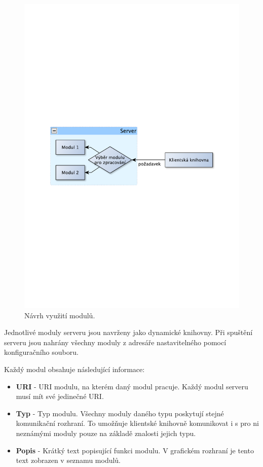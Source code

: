 \begin{figure}[h]
\centering
\includegraphics[trim=11cm 11cm 11cm 11cm, scale=0.7]{fig/navrh_moduly}
\caption{Návrh využití modulů.}
\label{fig:navrh_moduly}
\end{figure}

Jednotlivé moduly serveru jsou navrženy jako dynamické knihovny.
Při spuštění serveru jsou nahrány všechny moduly z adresáře nastavitelného pomocí konfiguračního souboru.

Každý modul obsahuje následující informace:

\begin{itemize}
\item \textbf{URI} - URI modulu, na kterém daný modul pracuje. Každý modul serveru musí mít své jedinečné URI.
\item \textbf{Typ} - Typ modulu. Všechny moduly daného typu poskytují stejné komunikační rozhraní. To umožňuje klientské knihovně
komunikovat i s pro ni neznámými moduly pouze na základě znalosti jejich typu.
\item \textbf{Popis} - Krátký text popisující funkci modulu. V grafickém rozhraní je tento text zobrazen v seznamu modulů.
\end{itemize}

